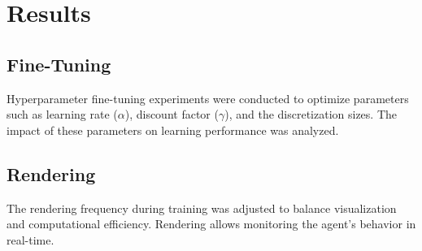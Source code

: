 \documentclass{article}
\begin{document}
\section{Results}

\subsection{Fine-Tuning}
Hyperparameter fine-tuning experiments were conducted to optimize parameters such as learning rate (\(\alpha\)), discount 
factor (\(\gamma\)), and the discretization sizes. The impact of these parameters on learning performance was analyzed.

\subsection{Rendering}
The rendering frequency during training was adjusted to balance visualization and computational efficiency. Rendering allows 
monitoring the agent's behavior in real-time.

\end{document}
